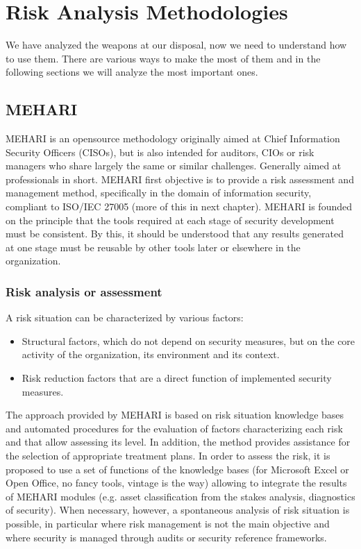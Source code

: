 \chapter{Risk Analysis Methodologies}
We have analyzed the weapons at our disposal, now we need to understand how to use them. There are various ways to make the most of them and in the following sections we will analyze the most important ones.
\section{MEHARI}
MEHARI \cite{CLUSIF2010} is an opensource methodology originally aimed at Chief Information Security Officers (CISOs), but is also intended for auditors, CIOs or risk managers who share largely the same or similar challenges. Generally aimed at professionals in short. MEHARI first objective is to provide a risk assessment and management method, specifically in the domain of information security, compliant to ISO/IEC 27005 (more of this in next chapter). MEHARI is founded on the principle that the tools required at each stage of security development must be consistent. By this, it should be understood that any results generated at one stage must be reusable by other tools later or elsewhere in the organization.
\subsection{Risk analysis or assessment}
A risk situation can be characterized by various factors:
\begin{itemize}
    \item Structural factors, which do not depend on security measures, but on the core activity of the organization, its environment and its context.
    \item Risk reduction factors that are a direct function of implemented security measures.
\end{itemize}
The approach provided by MEHARI is based on risk situation knowledge bases and automated
procedures for the evaluation of factors characterizing each risk and that allow assessing its
level. In addition, the method provides assistance for the selection of appropriate treatment
plans. In order to assess the risk, it is proposed to use a set of functions of the knowledge bases (for Microsoft Excel or Open Office, no fancy tools, vintage is the way) allowing to integrate the results of MEHARI modules (e.g. asset classification from the stakes analysis, diagnostics of security). When necessary, however, a spontaneous analysis of risk situation is possible, in particular where risk management is not the main objective and where security is managed through audits or security reference frameworks.
